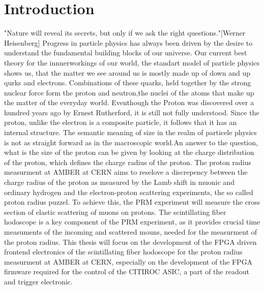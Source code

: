 \chapter{Introduction}
\label{chap:introduction}
"Nature will reveal its secrets, but only if we ask the right questions."[Werner Heisenberg]
\newline
Progress in particle physics has always been driven by the desire to understand the fundamental building blocks of our universe.
\newline Our current best theory for the innnerworkings of our world,
the standart model of particle physics shows us, that the matter we see around us is mostly made up of down and up qurks and electrons.
Combinations of these quarks, held together by the strong nuclear force form the proton and neutron,the nuclei of the atoms that make up the matter of the everyday world.
Eventhough the Proton was discovered over a hundred years ago by Ernest Rutherford\autocite{discoveryProton}, it is still not fully understood.
\newline
Since the proton, unlike the electron is a composite particle, it follows that it has an internal structure.
The semantic meaning of size in the realm of particele physics is not as straight forward as in the macroscopic world.An answer to the question,
what is the size of the proton can be given 
by looking at the charge distribution of the proton, which defines the charge radius of the proton.
\newline
The proton radius measurment at AMBER at CERN aims to reselove a discrepency between the charge radius of the proton as measured by the Lamb shift in muonic and ordinary hydrogen and the electron-proton scattering experiments,
the so called proton radius puzzel.
\newline
To achieve this, the PRM experiment will measure the cross section of elastic scattering of muons on protons.
The scintillating fiber hodoscope is a key component of the PRM experiment, as it provides crucial time measuments of the incoming and scattered mouns, needed for the measurment of the proton radius\Autocite{ProposalAmber}.
\newline
This thesis will focus on the development of the FPGA driven frontend electronics of the scintillating fiber hodoscope 
for the proton radius measurment at AMBER at CERN,
especially on the development of the FPGA firmware required for the control of the CITIROC ASIC, a part of the readout and trigger electronic. 

 
